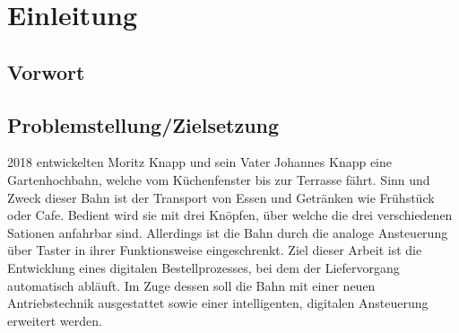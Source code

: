 \chapter{Einleitung}

\section{Vorwort}

\section{Problemstellung/Zielsetzung}
    2018 entwickelten Moritz Knapp und sein Vater Johannes Knapp eine Gartenhochbahn, welche vom Küchenfenster bis zur Terrasse fährt. 
    Sinn und Zweck dieser Bahn ist der Transport von Essen und Getränken wie Frühstück oder Cafe. Bedient wird sie mit drei Knöpfen, über welche die drei verschiedenen Sationen anfahrbar sind.
    Allerdings ist die Bahn durch die analoge Ansteuerung über Taster in ihrer Funktionsweise eingeschrenkt. Ziel dieser Arbeit ist die Entwicklung eines digitalen Bestellprozesses, bei dem der Liefervorgang automatisch abläuft. Im Zuge dessen soll die Bahn mit einer neuen Antriebstechnik ausgestattet sowie einer intelligenten, digitalen Ansteuerung erweitert werden. 
